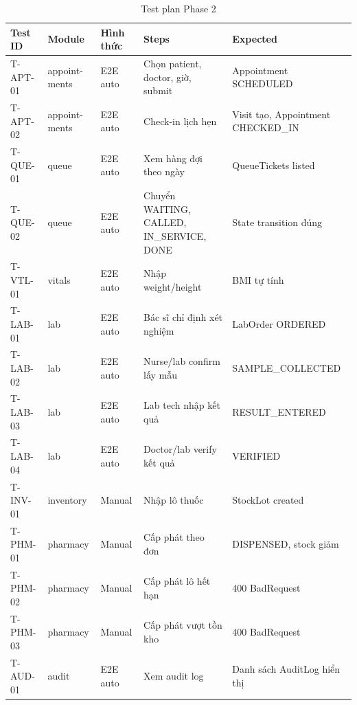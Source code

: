 \begin{longtable}{|p{1.8cm}|p{2.1cm}|p{1.7cm}|p{3.6cm}|p{4.6cm}|}
\caption{Test plan Phase 2}\\
\hline
\textbf{Test ID} & \textbf{Module} & \textbf{Hình thức} & \textbf{Steps} & \textbf{Expected} \\
\hline
T-APT-01 & appoint-\allowbreak ments & E2E auto & Chọn patient, doctor, giờ, submit & Appointment SCHEDULED \\
\hline
T-APT-02 & appoint-\allowbreak ments & E2E auto & Check-in lịch hẹn & Visit tạo, Appointment CHECKED\_IN \\
\hline
T-QUE-01 & queue & E2E auto & Xem hàng đợi theo ngày & QueueTickets listed \\
\hline
T-QUE-02 & queue & E2E auto & Chuyển WAITING, CALLED, IN\_SERVICE, DONE & State transition đúng \\
\hline
T-VTL-01 & vitals & E2E auto & Nhập weight/height & BMI tự tính \\
\hline
T-LAB-01 & lab & E2E auto & Bác sĩ chỉ định xét nghiệm & LabOrder ORDERED \\
\hline
T-LAB-02 & lab & E2E auto & Nurse/lab confirm lấy mẫu & SAMPLE\_COLLECTED \\
\hline
T-LAB-03 & lab & E2E auto & Lab tech nhập kết quả & RESULT\_ENTERED \\
\hline
T-LAB-04 & lab & E2E auto & Doctor/lab verify kết quả & VERIFIED \\
\hline
T-INV-01 & inventory & Manual & Nhập lô thuốc & StockLot created \\
\hline
T-PHM-01 & pharmacy & Manual & Cấp phát theo đơn & DISPENSED, stock giảm \\
\hline
T-PHM-02 & pharmacy & Manual & Cấp phát lô hết hạn & 400 BadRequest \\
\hline
T-PHM-03 & pharmacy & Manual & Cấp phát vượt tồn kho & 400 BadRequest \\
\hline
T-AUD-01 & audit & E2E auto & Xem audit log & Danh sách AuditLog hiển thị \\
\hline
\end{longtable}


